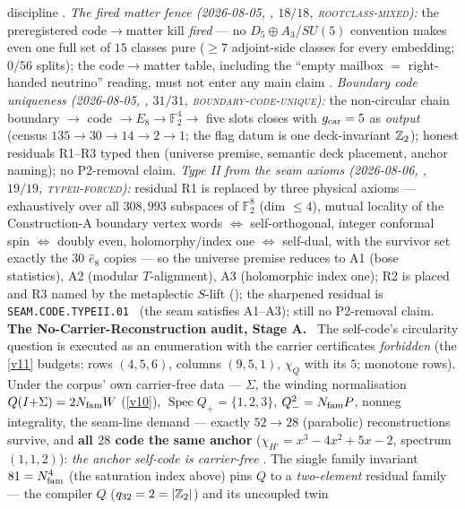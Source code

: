 \begin{winbox}
discipline \mE.  \emph{The fired matter fence (2026-08-05,
, $18/18$,
\textsc{rootclass-mixed}):} the preregistered code$\to$matter kill
\emph{fired} --- no $D_5{\oplus}A_3$/$SU(5)$ convention makes even
one full set of $15$ classes pure ($\ge7$ adjoint-side classes for
every embedding; $0/56$ splits); the code$\to$matter table,
including the ``empty mailbox $=$ right-handed neutrino'' reading,
must not enter any main claim \mE.  \emph{Boundary code uniqueness
(2026-08-05, ,
$31/31$, \textsc{boundary-code-unique}):} the non-circular chain
boundary $\to$ code $\to E_8\to\mathbb F_2^4\to$ five slots closes
with $g_{\mathrm{car}}=5$ as \emph{output} (census $135\to30\to14\to2\to1$;
the flag datum is one deck-invariant $\mathbb{Z}_2$); honest residuals
R1--R3 typed then (universe premise, semantic deck placement,
anchor naming); no P2-removal claim.  \emph{Type II from the seam
axioms (2026-08-06, , $19/19$,
\textsc{typeii-forced}):} residual R1 is replaced by three physical
axioms --- exhaustively over all $308{,}993$ subspaces of
$\mathbb F_2^8$ (dim $\le4$), mutual locality of the
Construction-A boundary vertex words $\iff$ self-orthogonal,
integer conformal spin $\iff$ doubly even, holomorphy/index one
$\iff$ self-dual, with the survivor set exactly the $30$
$\hat e_8$ copies --- so the universe premise reduces to A1 (bose
statistics), A2 (modular $T$-alignment), A3 (holomorphic index
one); R2 is placed and R3 named by the metaplectic $S$-lift
(); the sharpened
residual is \texttt{SEAM.CODE.TYPEII.01} \mC\ (the seam satisfies
A1--A3); still no P2-removal claim.
\noindent\textbf{The No-Carrier-Reconstruction audit, Stage A.}
\ The self-code's circularity question is
executed as an enumeration with the carrier certificates \emph{forbidden} (the \vref{v11} budgets:
rows $(4,5,6)$, columns $(9,5,1)$, $\chi_Q$ with its $5$; monotone rows).  Under the corpus' own
carrier-free data --- $\Sigma$, the winding normalisation $Q(I{+}\Sigma)=2N_{\mathrm{fam}} W$ (\vref{v10}),
$\operatorname{Spec}Q_+=\{1,2,3\}$, $Q_-^2=N_{\mathrm{fam}} P$, nonneg integrality, the seam-line demand ---
exactly $52\to28$ (parabolic) reconstructions survive, and \textbf{all $28$ code the same anchor}
($\chi_{H'}=x^3-4x^2+5x-2$, spectrum $(1,1,2)$): \emph{the anchor self-code is carrier-free} \mE.
The single family invariant $81=N_{\mathrm{fam}}^4$ (the saturation index above) pins $Q$ to a
\emph{two-element} residual family --- the compiler $Q$ ($q_{32}=2=|\mathbb{Z}_2|$) and its uncoupled twin

\end{winbox}
